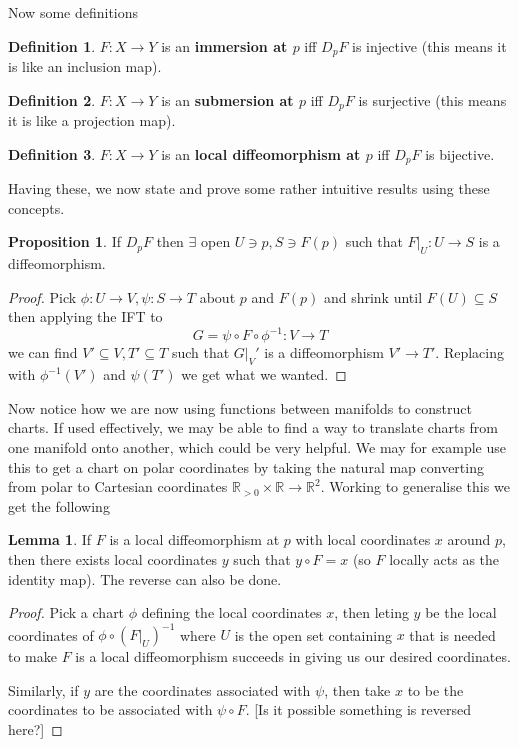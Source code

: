 \documentclass{article}
\theoremstyle{definition}
\newtheorem{definition}{Definition}
\newtheorem{proposition}{Proposition}
\newtheorem{lemma}{Lemma}
\begin{document}
Now some definitions

\begin{definition}
$F : X \to Y$ is an \textbf{immersion at $p$} iff $D_pF$ is injective (this
means it is like an inclusion map).
\end{definition}
\begin{definition}
$F : X \to Y$ is an \textbf{submersion at $p$} iff $D_pF$ is surjective (this
means it is like a projection map).
\end{definition}
\begin{definition}
$F : X \to Y$ is an \textbf{local diffeomorphism at $p$} iff $D_pF$ is bijective.
\end{definition}

Having these, we now state and prove some rather intuitive results using these concepts.

\begin{proposition}
If $D_pF$ then $\exists$ open $U \ni p, S \ni F(p)$ such that $F|_U : U \to S$
is a diffeomorphism.
\end{proposition}
\begin{proof}
Pick $\phi : U \to V, \psi : S \to T$ about $p$ and $F(p)$ and shrink until
$F(U) \subseteq S$ then applying the IFT to 
$$ G = \psi \circ F \circ \phi^{-1} : V \to T $$
we can find $V' \subseteq V, T' \subseteq T$ such that $G|_V'$ is a
diffeomorphism $V' \to T'$. Replacing with $\phi^{-1}(V')$ and $\psi(T')$ we get
what we wanted.
\end{proof}

Now notice how we are now using functions between manifolds to construct charts.
If used effectively, we may be able to find a way to translate charts from one
manifold onto another, which could be very helpful. We may for example use this
to get a chart on polar coordinates by taking the natural map converting from
polar to Cartesian coordinates $\mathbb{R}_{>0} \times \mathbb{R} \to
\mathbb{R}^2$. Working to generalise this we get the following

\begin{lemma}
If $F$ is a local diffeomorphism at $p$ with local coordinates $x$ around $p$,
then there exists local coordinates $y$ such that $y \circ F = x$ (so $F$
locally acts as the identity map). The reverse can also be done.
\end{lemma}
\begin{proof}
Pick a chart $\phi$ defining the local coordinates $x$, then leting $y$ be the
local coordinates of $\phi \circ 
(F |_U)^{-1}$ where $U$ is the open set containing $x$ that is needed to make
$F$ is a local diffeomorphism succeeds in giving us our desired coordinates.

Similarly, if $y$ are the coordinates associated with $\psi$, then take $x$ to
be the coordinates to be associated with $\psi \circ F$. [Is it possible
something is reversed here?]
\end{proof}
\end{document}
